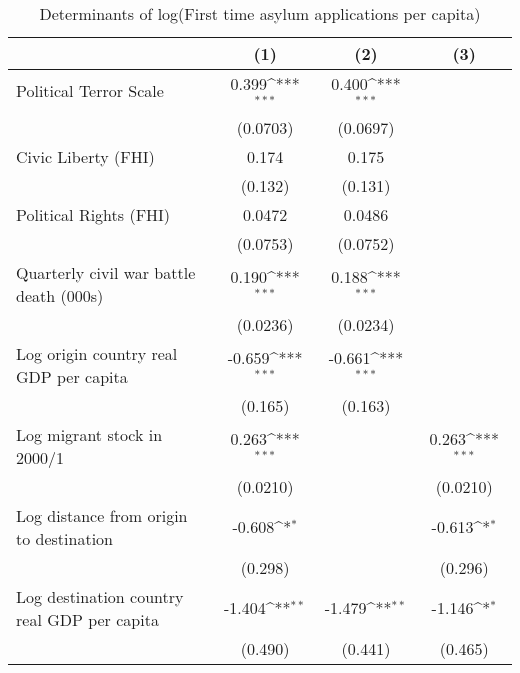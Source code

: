 \begin{table}[htbp]\centering
\def\sym#1{\ifmmode^{#1}\else\(^{#1}\)\fi}
\caption{Determinants of log(First time asylum applications per capita)}
\begin{tabular}{l*{3}{c}}
\hline\hline
                    &\multicolumn{1}{c}{(1)}         &\multicolumn{1}{c}{(2)}         &\multicolumn{1}{c}{(3)}         \\
\hline
Political Terror Scale&       0.399\sym{***}&       0.400\sym{***}&                     \\
                    &    (0.0703)         &    (0.0697)         &                     \\
[1em]
Civic Liberty (FHI) &       0.174         &       0.175         &                     \\
                    &     (0.132)         &     (0.131)         &                     \\
[1em]
Political Rights (FHI)&      0.0472         &      0.0486         &                     \\
                    &    (0.0753)         &    (0.0752)         &                     \\
[1em]
Quarterly civil war battle death (000s)&       0.190\sym{***}&       0.188\sym{***}&                     \\
                    &    (0.0236)         &    (0.0234)         &                     \\
[1em]
Log origin country real GDP per capita&      -0.659\sym{***}&      -0.661\sym{***}&                     \\
                    &     (0.165)         &     (0.163)         &                     \\
[1em]
Log migrant stock in 2000/1&       0.263\sym{***}&                     &       0.263\sym{***}\\
                    &    (0.0210)         &                     &    (0.0210)         \\
[1em]
Log distance from origin to destination&      -0.608\sym{*}  &                     &      -0.613\sym{*}  \\
                    &     (0.298)         &                     &     (0.296)         \\
[1em]
Log destination country real GDP per capita&      -1.404\sym{**} &      -1.479\sym{**} &      -1.146\sym{*}  \\
                    &     (0.490)         &     (0.441)         &     (0.465)         \\

\end{tabular}
\end{table}
